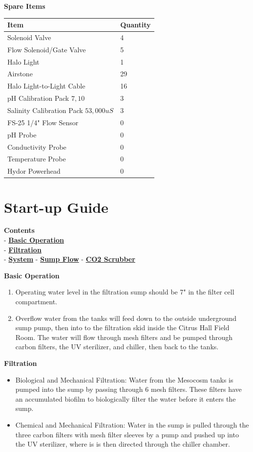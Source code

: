 \documentclass[]{book}
\providecommand{\tightlist}{%
  \setlength{\itemsep}{0pt}\setlength{\parskip}{0pt}}
\begin{document}
 \textbf{Spare Items}

\begin{longtable}[]{@{}ll@{}}
\toprule
Item & Quantity\tabularnewline
\midrule
\endhead
Solenoid Valve & 4\tabularnewline
Flow Solenoid/Gate Valve & 5\tabularnewline
Halo Light & 1\tabularnewline
Airstone & 29\tabularnewline
Halo Light-to-Light Cable & 16\tabularnewline
pH Calibration Pack \(7,10\) & 3\tabularnewline
Salinity Calibration Pack \(53,000 uS\) & 3\tabularnewline
FS-25 1/4" Flow Sensor & 0\tabularnewline
pH Probe & 0\tabularnewline
Conductivity Probe & 0\tabularnewline
Temperature Probe & 0\tabularnewline
Hydor Powerhead & 0\tabularnewline
\bottomrule
\end{longtable}

\chapter{Start-up Guide}\label{start-up-guide}

\textbf{Contents}\\
- \protect\hyperlink{Basic_Operation}{\textbf{Basic Operation}}\\
- \protect\hyperlink{Filtration}{\textbf{Filtration}}\\
- \protect\hyperlink{System}{\textbf{System}} -
\protect\hyperlink{Sump_Flow}{\textbf{Sump Flow}} -
\protect\hyperlink{CO2_Scrubber}{\textbf{CO2 Scrubber}}

 \textbf{Basic Operation}

\begin{enumerate}
\def\labelenumi{\arabic{enumi}.}
\tightlist
\item
  Operating water level in the filtration sump should be 7" in the
  filter cell compartment.
\item
  Overflow water from the tanks will feed down to the outside
  underground sump pump, then into to the filtration skid inside the
  Citrus Hall Field Room. The water will flow through mesh filters and
  be pumped through carbon filters, the UV sterilizer, and chiller, then
  back to the tanks.
\end{enumerate}

 \textbf{Filtration}

\begin{itemize}
\tightlist
\item
  Biological and Mechanical Filtration: Water from the Mesocosm tanks is
  pumped into the sump by passing through 6 mesh filters. These filters
  have an accumulated biofilm to biologically filter the water before it
  enters the sump.
\item
  Chemical and Mechanical Filtration: Water in the sump is pulled
  through the three carbon filters with mesh filter sleeves by a pump
  and pushed up into the UV sterilizer, where is is then directed
  through the chiller chamber.
\end{itemize}
\end{document}
